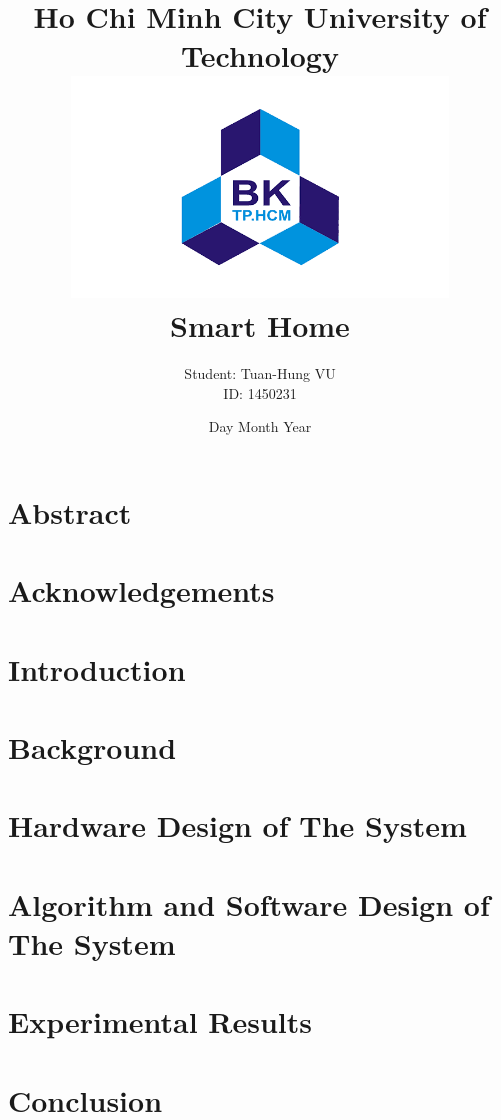 \documentclass[12pt]{report}
\title{
    {\huge Ho Chi Minh City University of Technology}\\
    {\includegraphics[width=100mm, scale=0.7]{BK_logo.png}}\\
    {\huge Smart Home}\\
}
\author{Student: Tuan-Hung VU\\ID: 1450231}
\date{Day Month Year}
\begin{document}
\maketitle
\chapter*{Abstract}


\chapter*{Acknowledgements}


\tableofcontents
{%
\let\oldnumberline\numberline%
\renewcommand{\numberline}{\figurename~\oldnumberline}%
\listoffigures%
}
\listoftables
\printglossary[title={Acronym and Abbreviation}]
\newpage
\setcounter{page}{1}
\chapter{Introduction}

 
\chapter{Background}

% 
 
\chapter{Hardware Design of The System}

 
\chapter{Algorithm and Software Design of The System}

 
\chapter{Experimental Results}


\chapter{Conclusion}

\end{document}
